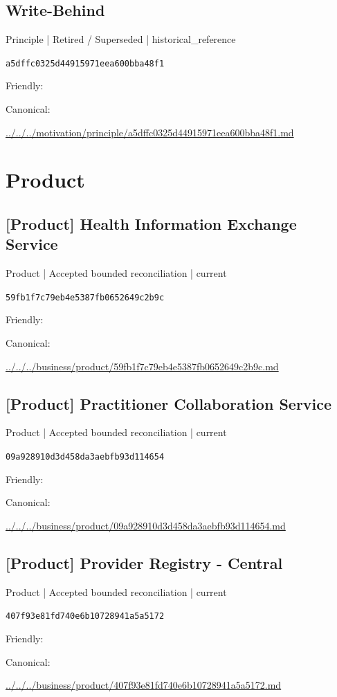 \documentclass[10pt,a4paper]{article}
\begin{document}
\subsection*{Write-Behind}
{\small Principle | Retired / Superseded | historical\_reference}\par
\texttt{a5dffc0325d44915971eea600bba48f1}\par
Friendly: \par
Canonical: \par
{\footnotesize\url{../../../motivation/principle/a5dffc0325d44915971eea600bba48f1.md}}\par
\section*{Product}
\subsection*{[Product] Health Information Exchange Service}
{\small Product | Accepted bounded reconciliation | current}\par
\texttt{59fb1f7c79eb4e5387fb0652649c2b9c}\par
Friendly: \par
Canonical: \par
{\footnotesize\url{../../../business/product/59fb1f7c79eb4e5387fb0652649c2b9c.md}}\par
\subsection*{[Product] Practitioner Collaboration Service}
{\small Product | Accepted bounded reconciliation | current}\par
\texttt{09a928910d3d458da3aebfb93d114654}\par
Friendly: \par
Canonical: \par
{\footnotesize\url{../../../business/product/09a928910d3d458da3aebfb93d114654.md}}\par
\subsection*{[Product] Provider Registry - Central}
{\small Product | Accepted bounded reconciliation | current}\par
\texttt{407f93e81fd740e6b10728941a5a5172}\par
Friendly: \par
Canonical: \par
{\footnotesize\url{../../../business/product/407f93e81fd740e6b10728941a5a5172.md}}\par
\end{document}
